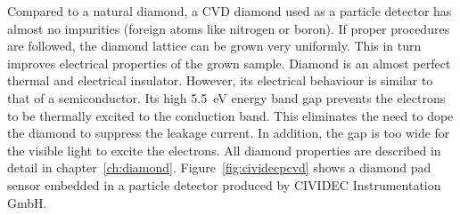 Compared to a natural diamond, a CVD diamond used as a particle detector has almost no impurities (foreign atoms like nitrogen or boron). If proper procedures are followed, the diamond lattice can be grown very uniformly. This in turn improves electrical properties of the grown sample. Diamond is an almost perfect thermal and electrical insulator. However, its electrical behaviour is similar to that of a semiconductor. Its high 5.5~eV energy band gap prevents the electrons to be thermally excited to the conduction band. This eliminates the need to dope the diamond to suppress the leakage current. In addition, the gap is too wide for the visible light to excite the electrons. All diamond properties are described in detail in chapter~\ref{ch:diamond}. Figure~\ref{fig:cividecpcvd} shows a diamond pad sensor embedded in a particle detector produced by CIVIDEC Instrumentation GmbH.

